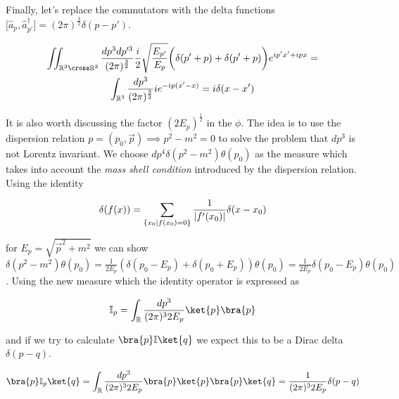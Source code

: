 Finally, let's replace the commutators with the delta functions $\big[\hat{a}_{p}, \hat{a}^{\dagger}_{p'} \big] = (2 \pi)^{\frac{3}{2}} \delta(p - p')$.

\begin{equation*}
    \begin{gathered}
        \iint_{\mathbb{R}^{3} \cross \mathbb{R}^{3}} \frac{dp^{3} dp'^{3}}{(2 \pi)^{\frac{3}{2}}} \frac{i}{2} \sqrt{\frac{E_{p'}}{E_{p}}}
        \bigg( \delta(p' + p) + \delta(p' + p) \bigg) e^{i p' x' + i p x} = \\
        \int_{\mathbb{R}^{3}} \frac{dp^{3}}{(2 \pi)^{\frac{3}{2}}} i e^{- i p(x' - x)} = i \delta(x - x') \\
    \end{gathered}
\end{equation*}

It is also worth discussing the factor $(2 E_{p})^{\frac{1}{2}}$ in the $\phi$. The idea is
to use the dispersion relation $p = (p_{0}, \vec{p}) \implies p^{2} - m^2 = 0$ to solve the problem that $dp^{3}$ is
not Lorentz invariant. We choose $dp^{4} \delta(p^{2} - m^2) \theta(p_{0})$ as the measure which takes into account 
the \textit{mass shell condition} introduced by the dispersion relation. Using the identity

\begin{equation*}
    \delta(f(x)) = \sum_{\{x_{0} \\ | \\ f(x_{0}) = 0\}} \frac{1}{|f'(x_{0})|} \delta(x - x_{0})
\end{equation*}

for $E_{p} = \sqrt{\vec{p}^{2} + m^{2}}$ we can show $\delta(p^{2} - m^2) \theta(p_{0}) = \frac{1}{2 E_{p}} (\delta(p_{0} - E_{p}) + 
\delta(p_{0} + E_{p})) \theta(p_{0}) = \frac{1}{2 E_{p}} \delta(p_{0} - E_{p}) \theta(p_{0})$. Using the new measure which
the identity operator is expressed as 

\begin{equation*}
    \mathbb{I}_{p} = \int_{\mathbb{R}} \frac{dp^{3}}{(2 \pi)^{3} 2 E_{p}} \ket{p} \bra{p}
\end{equation*}

and if we try to calculate $\bra{p} \mathbb{I} \ket{q}$ we expect this to be a Dirac delta $\delta(p - q)$.

\begin{equation*}
    \bra{p} \mathbb{I}_{p} \ket{q} = \int_{\mathbb{R}} \frac{dp^{3}}{(2 \pi)^{3} 2 E_{p}} \bra{p} \ket{p} \bra{p}\ket{q} = \frac{1}{(2 \pi)^{3} 2 E_{p}} \delta(p - q)
\end{equation*}

